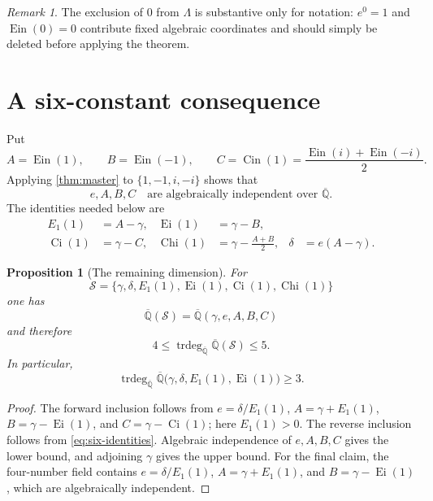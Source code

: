 \documentclass[11pt]{article}
\newtheorem{proposition}[theorem]{Proposition}
\theoremstyle{definition}
\theoremstyle{remark}
\newtheorem{remark}[theorem]{Remark}
\newcommand{\Qb}{\overline{\mathbb Q}}
\newcommand{\trdeg}{\operatorname{trdeg}}
\newcommand{\Ein}{\operatorname{Ein}}
\newcommand{\Cin}{\operatorname{Cin}}
\newcommand{\Ei}{\operatorname{Ei}}
\newcommand{\Ci}{\operatorname{Ci}}
\newcommand{\Chi}{\operatorname{Chi}}
\begin{document}
\begin{remark}
The exclusion of \(0\) from \(\Lambda\) is substantive only for notation:
\(e^0=1\) and \(\Ein(0)=0\) contribute fixed algebraic coordinates and should
simply be deleted before applying the theorem.
\end{remark}

















\section{A six-constant consequence}

Put
\[
 A=\Ein(1),\qquad B=\Ein(-1),\qquad
 C=\Cin(1)=\frac{\Ein(i)+\Ein(-i)}2.
\]
Applying \cref{thm:master} to \(\{1,-1,i,-i\}\) shows that
\begin{equation}\label{eq:eabc-ind}
 e,A,B,C\quad\text{are algebraically independent over }\Qb.
\end{equation}
The identities needed below are
\begin{align}
 E_1(1)&=A-\gamma,&
 \Ei(1)&=\gamma-B,\label{eq:six-identities}\\
 \Ci(1)&=\gamma-C,&
 \Chi(1)&=\gamma-\frac{A+B}{2},&
 \delta&=e(A-\gamma).\nonumber
\end{align}

\begin{proposition}[The remaining dimension]\label{prop:one-dimension}
For
\[
 \mathcal S=\{\gamma,\delta,E_1(1),\Ei(1),\Ci(1),\Chi(1)\}
\]
one has
\[
 \Qb(\mathcal S)=\Qb(\gamma,e,A,B,C)
\]
and therefore
\[
 4\le \trdeg_{\Qb}\Qb(\mathcal S)\le5.
\]
In particular,
\[
 \trdeg_{\Qb}\Qb\bigl(\gamma,\delta,E_1(1),\Ei(1)\bigr)\ge3.
\]
\end{proposition}

\begin{proof}
The forward inclusion follows from
\(e=\delta/E_1(1)\), \(A=\gamma+E_1(1)\),
\(B=\gamma-\Ei(1)\), and \(C=\gamma-\Ci(1)\); here
\(E_1(1)>0\).  The reverse inclusion follows from
\eqref{eq:six-identities}.  Algebraic independence of \(e,A,B,C\) gives the
lower bound, and adjoining \(\gamma\) gives the upper bound.  For the final
claim, the four-number field contains
\(e=\delta/E_1(1)\), \(A=\gamma+E_1(1)\), and
\(B=\gamma-\Ei(1)\), which are algebraically independent.
\end{proof}
\end{document}

